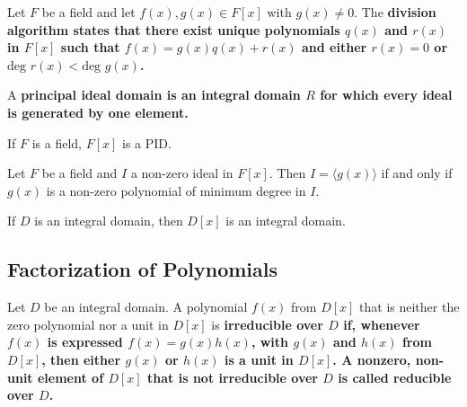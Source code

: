 \documentclass{hmwk}
\begin{document}
\begin{prop}
Let $F$ be a field and let $f(x), g(x) \in F[x]$ with $g(x)\neq 0$. The \bf{division algorithm} states that there exist unique polynomials $q(x)$ and $r(x)$ in $F[x]$ such that $f(x) = g(x)q(x) + r(x)$ and either $r(x) = 0$ or $\text{deg } r(x) < \text{deg } g(x)$.
\end{prop}

\begin{defn}
A \bf{principal ideal domain} is an integral domain $R$ for which every ideal is generated by one element.
\end{defn}

\begin{prop}
If $F$ is a field, $F[x]$ is a PID.
\end{prop}

\begin{prop}
Let $F$ be a field and $I$ a non-zero ideal in $F[x]$. Then $I = \langle g(x) \rangle$ if and only if $g(x)$ is a non-zero polynomial of minimum degree in $I$.
\end{prop}

\begin{prop}
If $D$ is an integral domain, then $D[x]$ is an integral domain.
\end{prop}

\subsection{Factorization of Polynomials}

\begin{defn}
Let $D$ be an integral domain. A polynomial $f(x)$ from $D[x]$ that is neither the zero polynomial nor a unit in $D[x]$ is \bf{irreducible} over $D$ if, whenever $f(x)$ is expressed $f(x) = g(x)h(x)$, with $g(x)$ and $h(x)$ from $D[x]$, then either $g(x)$ or $h(x)$ is a unit in $D[x]$. A nonzero, non-unit element of $D[x]$ that is not irreducible over $D$ is called \bf{reducible} over $D$.
\end{defn}
\end{document}
